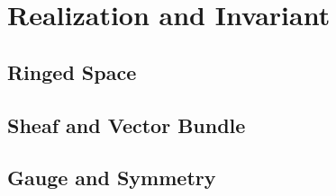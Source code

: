 \chapter{Realization and Invariant}\label{chap:realization} %

\section{Ringed Space}

\section{Sheaf and Vector Bundle}

\section{Gauge and Symmetry}
